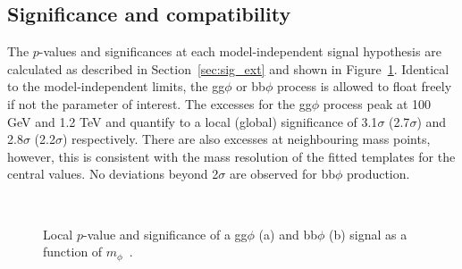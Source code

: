 \subsection{Significance and compatibility}
\label{sec:sig_and_compat}

The $p$-values and significances at each model-independent signal hypothesis are calculated as described in Section~\ref{sec:sig_ext} and shown in Figure~\ref{fig:significance}.
Identical to the model-independent limits, the gg$\phi$ or bb$\phi$ process is allowed to float freely if not the parameter of interest.
The excesses for the gg$\phi$ process peak at 100 GeV and 1.2 TeV and quantify to a local (global) significance of 3.1$\sigma$ (2.7$\sigma$) and 2.8$\sigma$ (2.2$\sigma$) respectively.
There are also excesses at neighbouring mass points, however, this is consistent with the mass resolution of the fitted templates for the central values.
No deviations beyond 2$\sigma$ are observed for bb$\phi$ production. \\

\begin{figure}[p!]
\centering
     \\
\caption[Plots of the local $p$-value and significance for gluon fusion and b-associated production.]{Local $p$-value and significance of a gg$\phi$ (a) and bb$\phi$ (b) signal as a function of $m_{\phi}$~\cite{CMS:2022rbd}.}
\label{fig:significance}
\end{figure}


